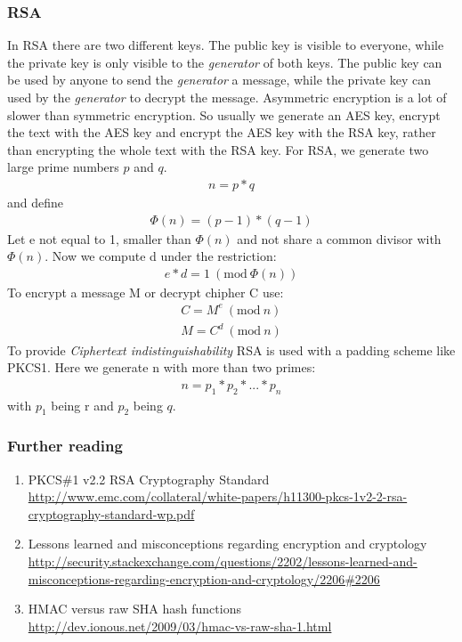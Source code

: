 \documentclass{scrartcl}
\begin{document}
\subsubsection{RSA}
In RSA there are two different keys. The public key is visible to everyone, while the private key is only visible to the \textit{generator} of both keys. The public key can be used by anyone to send the \textit{generator} a message, while the private key can used by the \textit{generator} to decrypt the message. Asymmetric encryption is a lot of slower than symmetric encryption. So usually we generate an AES key, encrypt the text with the AES key and encrypt the AES key with the RSA key, rather than encrypting the whole text with the RSA key.
For RSA, we generate two large prime numbers $p$ and $q$.
\begin{eqnarray*}
 n = p *q 
\end{eqnarray*}
 and define
\begin{eqnarray*}
 \Phi(n) = (p-1)*(q-1)
\end{eqnarray*}
 Let e not equal to 1, smaller than $ \Phi(n)$ and not share a common divisor with $ \Phi(n)$.
 Now we compute d under the restriction:
 \newcommand{\Mod}[1]{\ (\text{mod}\ #1)}
\begin{eqnarray*}
 e*d = 1 \Mod{\Phi(n)}
\end{eqnarray*}
 To encrypt a message M or decrypt chipher C use:
\begin{eqnarray*}
 C = M^e \Mod{n}\\
 M = C^d \Mod{n}
\end{eqnarray*}
 To provide \textit{Ciphertext indistinguishability} RSA is used with a padding scheme like PKCS1. Here we generate n with more than two primes:
 \begin{eqnarray*}
 n = p_1*p_2*...*p_n
\end{eqnarray*}
with $p_1$ being r and $p_2$ being $q$.
\cite{carle}

\subsubsection{Further reading}
\begin{enumerate}
\item PKCS\#1 v2.2 RSA Cryptography Standard\\\url{http://www.emc.com/collateral/white-papers/h11300-pkcs-1v2-2-rsa-cryptography-standard-wp.pdf} 
\item Lessons learned and misconceptions regarding encryption and cryptology \\\url{
http://security.stackexchange.com/questions/2202/lessons-learned-and-misconceptions-regarding-encryption-and-cryptology/2206#2206}
\item HMAC versus raw SHA hash functions \\\url{
http://dev.ionous.net/2009/03/hmac-vs-raw-sha-1.html}
\end{enumerate}
\end{document}
